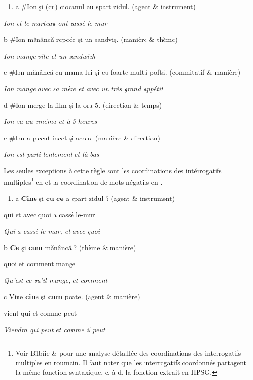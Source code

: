 \begin{enumerate}
\item \label{bkm:Ref272836229}a  \#Ion şi (cu) ciocanul au spart zidul.      (agent \& instrument)


\end{enumerate}
{\itshape
Ion et le marteau ont cassé le mur} 

  b  \#Ion mănâncă repede şi un sandviş.      (manière \& thème)

{\itshape
Ion mange vite et un sandwich} 

  c  \#Ion mănâncă cu mama lui şi cu foarte multă poftă.  (commitatif \& manière)

{\itshape
Ion mange avec sa mère et avec un très grand appétit}

  d  \#Ion merge la film şi la ora 5.         (direction \& temps)

{\itshape
Ion va au cinéma et à 5 heures}

  e  \#Ion a plecat încet şi acolo.          (manière \& direction)

{\itshape
Ion est parti lentement et là-bas} 

Les seules exceptions à cette règle sont les coordinations des intérrogatifs multiples\footnote{Voir Bîlbîie \& \citet{Gazdik2011} pour une analyse détaillée des coordinations des interrogatifs multiples en roumain. Il faut noter que les interrogatifs coordonnés partagent la même fonction syntaxique, c.-à-d. la fonction extrait en HPSG.}  en  et la coordination de mots négatifs en . 


\begin{enumerate}
\item \label{bkm:Ref268618145}a  \textbf{Cine}  şi  \textbf{cu  ce}  a  spart  zidul ?        (agent \& instrument)


\end{enumerate}
qui  et  avec  quoi  a  cassé  le-mur

{\itshape
  Qui a cassé le mur, et avec quoi}

  b  \textbf{Ce}  şi  \textbf{cum}  mănâncă ?        (thème \& manière)

    quoi  et  comment  mange

{\itshape
  Qu'est-ce qu'il mange, et comment} 

c  Vine  \textbf{cine } şi  \textbf{cum } poate.        (agent \& manière)

  vient  qui  et  comme  peut

{\itshape
Viendra qui peut et comme il peut}

